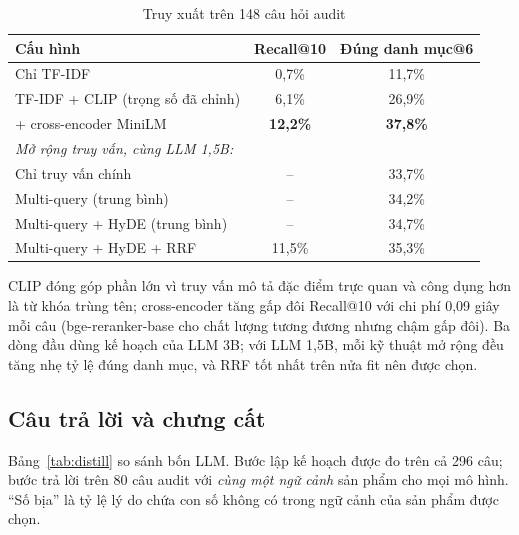 \documentclass[conference,a4paper]{IEEEtran}
\begin{document}
\begin{table}[t]
\caption{Truy xuất trên 148 câu hỏi audit}
\label{tab:ragret}
\centering
\begin{tabular}{lcc}
\toprule
Cấu hình & Recall@10 & Đúng danh mục@6\\
\midrule
Chỉ TF-IDF & 0,7\% & 11,7\%\\
TF-IDF + CLIP (trọng số đã chỉnh) & 6,1\% & 26,9\%\\
\quad + cross-encoder MiniLM & \textbf{12,2\%} & \textbf{37,8\%}\\
\midrule
\multicolumn{3}{l}{\emph{Mở rộng truy vấn, cùng LLM 1,5B:}}\\
Chỉ truy vấn chính & -- & 33,7\%\\
Multi-query (trung bình) & -- & 34,2\%\\
Multi-query + HyDE (trung bình) & -- & 34,7\%\\
Multi-query + HyDE + RRF & 11,5\% & 35,3\%\\
\bottomrule
\end{tabular}
\end{table}

CLIP đóng góp phần lớn vì truy vấn mô tả đặc điểm trực quan và công dụng hơn là từ khóa trùng tên; cross-encoder tăng gấp đôi Recall@10 với chi phí 0,09 giây mỗi câu (bge-reranker-base cho chất lượng tương đương nhưng chậm gấp đôi). Ba dòng đầu dùng kế hoạch của LLM 3B; với LLM 1,5B, mỗi kỹ thuật mở rộng đều tăng nhẹ tỷ lệ đúng danh mục, và RRF tốt nhất trên nửa fit nên được chọn.

\subsection{Câu trả lời và chưng cất}
Bảng~\ref{tab:distill} so sánh bốn LLM. Bước lập kế hoạch được đo trên cả 296 câu; bước trả lời trên 80 câu audit với \emph{cùng một ngữ cảnh} sản phẩm cho mọi mô hình. ``Số bịa'' là tỷ lệ lý do chứa con số không có trong ngữ cảnh của sản phẩm được chọn.
\end{document}

